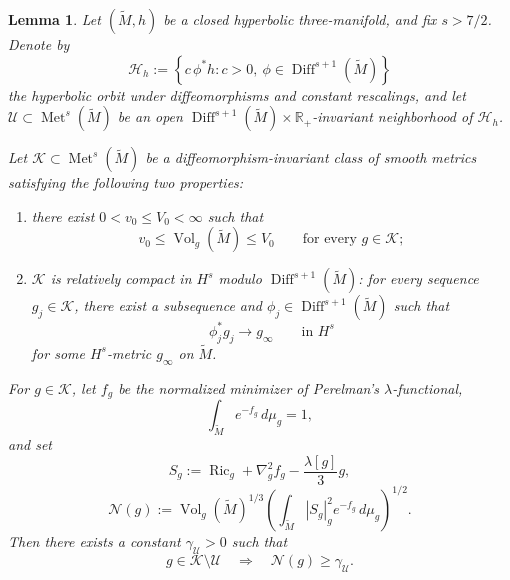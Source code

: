 \documentclass[10pt,a4paper]{amsart}
\newtheorem{lemma}{Lemma}
\begin{document}
\begin{lemma}
\label{lem:uniform-soliton-defect-gap}
Let \((\widetilde M,h)\) be a closed hyperbolic three-manifold, and
fix \(s>7/2\). Denote by
\[
        \mathscr H_h
        :=
        \left\{
                c\,\phi^*h:
                c>0,\ 
                \phi\in\operatorname{Diff}^{s+1}(\widetilde M)
        \right\}
\]
the hyperbolic orbit under diffeomorphisms and constant rescalings,
and let
$\mathcal U\subset\operatorname{Met}^s(\widetilde M)$
be an open
\(\operatorname{Diff}^{s+1}(\widetilde M)\times\mathbb R_+\)-invariant
neighborhood of \(\mathscr H_h\).

\noindent Let \(\mathscr K\subset\operatorname{Met}^s(\widetilde M)\) be a
diffeomorphism-invariant class of smooth metrics satisfying the
following two properties:
\begin{enumerate}
\item there exist \(0<v_0\leq V_0<\infty\) such that
\[
        v_0
        \leq
        \operatorname{Vol}_g(\widetilde M)
        \leq
        V_0
        \qquad\text{for every }g\in\mathscr K;
\]
\item \(\mathscr K\) is relatively compact in \(H^s\) modulo
\(\operatorname{Diff}^{s+1}(\widetilde M)\): for every sequence
\(g_j\in\mathscr K\), there exist a subsequence and
\(\phi_j\in\operatorname{Diff}^{s+1}(\widetilde M)\) such that
\[
        \phi_j^*g_j\longrightarrow g_\infty
        \qquad\text{in }H^s
\]
for some \(H^s\)-metric \(g_\infty\) on \(\widetilde M\).
\end{enumerate}

\noindent For \(g\in\mathscr K\), let \(f_g\) be the normalized minimizer of
Perelman's \(\lambda\)-functional,
\[
        \int_{\widetilde M}e^{-f_g}\,d\mu_g=1,
\]
and set
\[
        S_g
        :=
        \operatorname{Ric}_g+\nabla_g^2f_g
        -\frac{\lambda[g]}{3}g,
\]
\[
        \mathcal N(g)
        :=
        \operatorname{Vol}_g(\widetilde M)^{1/3}
        \left(
        \int_{\widetilde M}
        |S_g|_g^2e^{-f_g}\,d\mu_g
        \right)^{1/2}.
\]
Then there exists a constant
$\gamma_{\mathcal U}>0$
such that
\begin{equation}
\label{eq:uniform-soliton-defect-gap}
        g\in\mathscr K\setminus\mathcal U
        \quad\Longrightarrow\quad
        \mathcal N(g)\geq\gamma_{\mathcal U}.
\end{equation}
\end{lemma}
\end{document}
